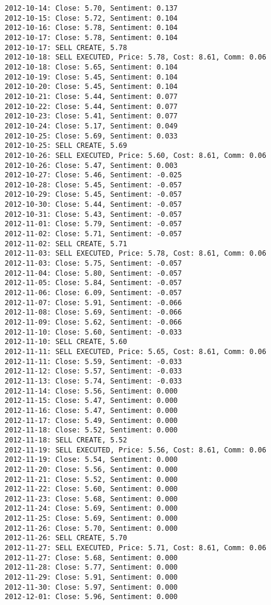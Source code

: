 \documentclass[11pt]{article}
\begin{document}
\begin{Verbatim}[commandchars=\\\{\}]
2012-10-14: Close: 5.70, Sentiment: 0.137
2012-10-15: Close: 5.72, Sentiment: 0.104
2012-10-16: Close: 5.78, Sentiment: 0.104
2012-10-17: Close: 5.78, Sentiment: 0.104
2012-10-17: SELL CREATE, 5.78
2012-10-18: SELL EXECUTED, Price: 5.78, Cost: 8.61, Comm: 0.06
2012-10-18: Close: 5.65, Sentiment: 0.104
2012-10-19: Close: 5.45, Sentiment: 0.104
2012-10-20: Close: 5.45, Sentiment: 0.104
2012-10-21: Close: 5.44, Sentiment: 0.077
2012-10-22: Close: 5.44, Sentiment: 0.077
2012-10-23: Close: 5.41, Sentiment: 0.077
2012-10-24: Close: 5.17, Sentiment: 0.049
2012-10-25: Close: 5.69, Sentiment: 0.033
2012-10-25: SELL CREATE, 5.69
2012-10-26: SELL EXECUTED, Price: 5.60, Cost: 8.61, Comm: 0.06
2012-10-26: Close: 5.47, Sentiment: 0.003
2012-10-27: Close: 5.46, Sentiment: -0.025
2012-10-28: Close: 5.45, Sentiment: -0.057
2012-10-29: Close: 5.45, Sentiment: -0.057
2012-10-30: Close: 5.44, Sentiment: -0.057
2012-10-31: Close: 5.43, Sentiment: -0.057
2012-11-01: Close: 5.79, Sentiment: -0.057
2012-11-02: Close: 5.71, Sentiment: -0.057
2012-11-02: SELL CREATE, 5.71
2012-11-03: SELL EXECUTED, Price: 5.78, Cost: 8.61, Comm: 0.06
2012-11-03: Close: 5.75, Sentiment: -0.057
2012-11-04: Close: 5.80, Sentiment: -0.057
2012-11-05: Close: 5.84, Sentiment: -0.057
2012-11-06: Close: 6.09, Sentiment: -0.057
2012-11-07: Close: 5.91, Sentiment: -0.066
2012-11-08: Close: 5.69, Sentiment: -0.066
2012-11-09: Close: 5.62, Sentiment: -0.066
2012-11-10: Close: 5.60, Sentiment: -0.033
2012-11-10: SELL CREATE, 5.60
2012-11-11: SELL EXECUTED, Price: 5.65, Cost: 8.61, Comm: 0.06
2012-11-11: Close: 5.59, Sentiment: -0.033
2012-11-12: Close: 5.57, Sentiment: -0.033
2012-11-13: Close: 5.74, Sentiment: -0.033
2012-11-14: Close: 5.56, Sentiment: 0.000
2012-11-15: Close: 5.47, Sentiment: 0.000
2012-11-16: Close: 5.47, Sentiment: 0.000
2012-11-17: Close: 5.49, Sentiment: 0.000
2012-11-18: Close: 5.52, Sentiment: 0.000
2012-11-18: SELL CREATE, 5.52
2012-11-19: SELL EXECUTED, Price: 5.56, Cost: 8.61, Comm: 0.06
2012-11-19: Close: 5.54, Sentiment: 0.000
2012-11-20: Close: 5.56, Sentiment: 0.000
2012-11-21: Close: 5.52, Sentiment: 0.000
2012-11-22: Close: 5.60, Sentiment: 0.000
2012-11-23: Close: 5.68, Sentiment: 0.000
2012-11-24: Close: 5.69, Sentiment: 0.000
2012-11-25: Close: 5.69, Sentiment: 0.000
2012-11-26: Close: 5.70, Sentiment: 0.000
2012-11-26: SELL CREATE, 5.70
2012-11-27: SELL EXECUTED, Price: 5.71, Cost: 8.61, Comm: 0.06
2012-11-27: Close: 5.68, Sentiment: 0.000
2012-11-28: Close: 5.77, Sentiment: 0.000
2012-11-29: Close: 5.91, Sentiment: 0.000
2012-11-30: Close: 5.97, Sentiment: 0.000
2012-12-01: Close: 5.96, Sentiment: 0.000

\end{Verbatim}
\end{document}
